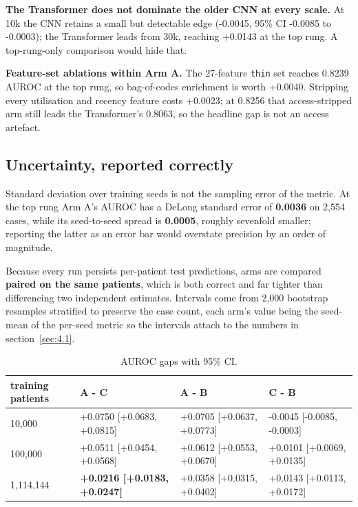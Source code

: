 \documentclass[10pt,twocolumn,letterpaper]{article}
\begin{document}
\textbf{The Transformer does not dominate the older CNN at every scale.} At 10k the CNN retains a small but detectable edge (-0.0045, 95\% CI -0.0085 to -0.0003); the Transformer leads from 30k, reaching +0.0143 at the top rung. A top-rung-only comparison would hide that.



\textbf{Feature-set ablations within Arm A.} The 27-feature \texttt{thin} set reaches 0.8239 AUROC at the top rung, so bag-of-codes enrichment is worth +0.0040. Stripping every utilisation and recency feature costs +0.0023; at 0.8256 that access-stripped arm still leads the Transformer's 0.8063, so the headline gap is not an access artefact.



\subsection{Uncertainty, reported correctly}\label{sec:4.2}



Standard deviation over training seeds is not the sampling error of the metric. At the top rung Arm A's AUROC has a DeLong standard error of \textbf{0.0036} on 2,554 cases, while its seed-to-seed spread is \textbf{0.0005}, roughly sevenfold smaller; reporting the latter as an error bar would overstate precision by an order of magnitude.



Because every run persists per-patient test predictions, arms are compared \textbf{paired on the same patients}, which is both correct and far tighter than differencing two independent estimates. Intervals come from 2,000 bootstrap resamples stratified to preserve the case count, each arm's value being the seed-mean of the per-seed metric so the intervals attach to the numbers in section~\ref{sec:4.1}.



\begin{table}[tbp]
\centering
\small
\caption{AUROC gaps with 95\% CI.}
\label{tab:2}
\begin{tabular}{llll}
\toprule
training patients & A - C & A - B & C - B \\
\midrule
10,000 & +0.0750 [+0.0683, +0.0815] & +0.0705 [+0.0637, +0.0773] & -0.0045 [-0.0085, -0.0003] \\
100,000 & +0.0511 [+0.0454, +0.0568] & +0.0612 [+0.0553, +0.0670] & +0.0101 [+0.0069, +0.0135] \\
1,114,144 & \textbf{+0.0216 [+0.0183, +0.0247]} & +0.0358 [+0.0315, +0.0402] & +0.0143 [+0.0113, +0.0172] \\
\bottomrule
\end{tabular}
\end{table}
\end{document}
